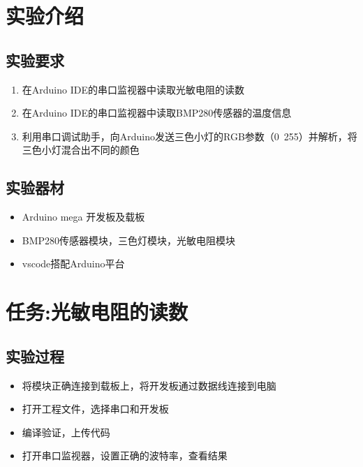\documentclass[12pt,hyperref,a4paper,UTF8]{ctexart}
\begin{document}
\cover

%
%

\thispagestyle{empty} %

\newpage
\tableofcontents

\newpage


\section{实验介绍}
\subsection{实验要求}

\begin{enumerate}[itemsep=-5pt, topsep=0pt, partopsep=0pt]
    \item 在Arduino IDE的串口监视器中读取光敏电阻的读数
    \item 在Arduino IDE的串口监视器中读取BMP280传感器的温度信息
    \item 利用串口调试助手，向Arduino发送三色小灯的RGB参数（0~255）并解析，将三色小灯混合出不同的颜色
\end{enumerate}
\subsection{实验器材}
\begin{itemize}[itemsep=-5pt, topsep=0pt, partopsep=0pt]
    \item Arduino mega 开发板及载板
    \item BMP280传感器模块，三色灯模块，光敏电阻模块
    \item vscode搭配Arduino平台
\end{itemize}


\section{任务:光敏电阻的读数}
\subsection{实验过程}
\begin{itemize}[itemsep=-5pt, topsep=0pt, partopsep=0pt]
    \item 将模块正确连接到载板上，将开发板通过数据线连接到电脑
    \item 打开工程文件，选择串口和开发板
    \item 编译验证，上传代码
    \item 打开串口监视器，设置正确的波特率，查看结果
\end{itemize}
\end{document}
